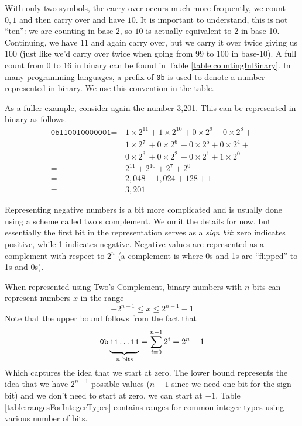 With only two symbols, the carry-over occurs much more frequently, 
we count $0, 1$ and then carry over and have $10$.  It is important to understand, this
is not ``ten'': we are counting in base-2, so $10$ is actually equivalent to 2 in base-10.
Continuing, we have $11$ and again carry over, but we carry it over twice giving us
100 (just like we'd carry over twice when going from 99 to 100 in base-10).
A full count from 0 to 16 in binary can be found in Table \ref{table:countingInBinary}.
In many programming languages, a prefix of \texttt{0b} is used to denote a number
represented in binary.  We use this convention in the table.  

As a fuller example, consider again the number 3,201.  This can be 
represented in binary as follows.
\begin{align*}
  \texttt{0b110010000001} = \, & 1 \times 2^{11} + 1 \times 2^{10} + 0 \times 2^{9} + 0 \times 2^{8} + \\
   & 1 \times 2^{7~} + 0 \times 2^{6~} + 0 \times 2^{5} + 0 \times 2^{4} + \\
   & 0 \times 2^{3~} + 0 \times 2^{2~} + 0 \times 2^{1} + 1 \times 2^{0} \\
   = \, & 2^{11} + 2^{10} + 2^{7} + 2^{0} \\
   = \, & 2,048 + 1,024 + 128 + 1 \\
   = \, & 3,201
\end{align*}

Representing negative numbers is a bit more complicated and is usually done
using a scheme called \gls{two's complement}.  We omit the details for now, but
essentially the first bit in the representation serves as a \emph{sign bit}: zero indicates 
positive, while 1 indicates negative.  Negative values are represented as a complement
with respect to $2^n$ (a complement is where 0s and 1s are ``flipped'' to 1s and 0s).

When represented using Two's Complement, binary numbers with $n$ bits can represent
numbers $x$ in the range
  $$-2^{n-1} \leq x \leq 2^{n-1}-1$$
Note that the upper bound follows from the fact that 
  $$\texttt{0b}\underbrace{ \vphantom{\frac{A}{B}} \texttt{11}\ldots \texttt{11}}_{n \textrm{ bits}} = \sum_{i=0}^{n-1} 2^i = 2^{n} -1$$
Which captures the idea that we start at zero.  The lower bound represents the idea
that we have $2^{n-1}$ possible values ($n-1$ since we need one bit for the sign bit) 
and we don't need to start at zero, we can start at $-1$.  Table \ref{table:rangesForIntegerTypes}
contains ranges for common integer types using various number of bits.

